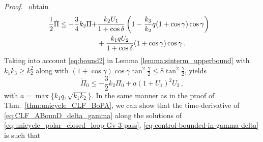 \documentclass[journal,twoside,web]{ieeecolor}
\theoremstyle{definition}
\renewenvironment{proof}[1][Proof]{\par\pushQED{\qed}\normalfont\textit{#1.}~}{\popQED\par}
\begin{document}
\begin{proof}
obtain
\begin{equation}
\hspace*{-0.3cm}
\begin{aligned}[b]
\frac{1}{2}\dot \Pi \le -  \frac{3}{4} k_2 \Pi +  &\frac{k_2  U_1}{1  + \cos \delta } \left( 1- \frac{k_3 }{k_2}  
q(1+\cos\gamma)\cos\gamma    \right)  \\ & + \frac{k_1 q U_2}{1 + \cos \delta}  (1+\cos \gamma) \cos \gamma 
 \,.
\end{aligned}
\end{equation}
 Taking into account \eqref{eq:bound2} in Lemma \ref{lemma:sinterm_upperbound} with $k_1 k_3 \ge  k_2^2$ along with $(1+\cos \gamma) \cos \gamma \tan^2 \frac{\gamma}{2}\le 8 \tan^2 \frac{\gamma}{2}$, 
yields
\begin{equation}
\dot{\Pi}_0 \le - \frac{3}{2}k_2 \Pi_0 + a   \left( 1 + U_1\right)^2 U_2 \,,
\end{equation}
with $a = \max \{k_1q, \sqrt{k_1 k_2}\}$. 
In the same manner as in the proof of Thm.~\ref{thm:unicycle_CLF_BoPA}, we can show that the time-derivative of \eqref{eq:CLF_ABounD_delta_gamma} along the solutions of \eqref{eq:unicycle_polar_closed_loop-Gv-3-pass}, \eqref{eq-control-bounded-in-gamma-delta} is such that

\end{proof}
\end{document}
